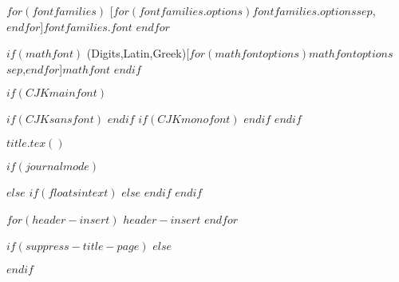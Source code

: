 $for(fontfamilies)$
  [$for(fontfamilies.options)$$fontfamilies.options$$sep$,$endfor$]{$fontfamilies.font$}
$endfor$

$if(mathfont)$
\setmathfont(Digits,Latin,Greek)[$for(mathfontoptions)$$mathfontoptions$$sep$,$endfor$]{$mathfont$}
$endif$

$if(CJKmainfont)$
    \usepackage{xeCJK}
    $if(CJKsansfont)$
    $endif$
    $if(CJKmonofont)$
    $endif$
$endif$

$title.tex()$

$if(journalmode)$
\usepackage{pbalance} 
\usepackage{float}
\makeatletter
\let\oldtpt\ThreePartTable
\let\endoldtpt\endThreePartTable
\def\ThreePartTable{\@ifnextchar[\ThreePartTable@i \ThreePartTable@ii}
\def\ThreePartTable@i[#1]{\begin{figure}[!htbp]
\onecolumn
\begin{minipage}{0.5\textwidth}
\oldtpt[#1]
}
\def\ThreePartTable@ii{\begin{figure}[!htbp]
\onecolumn
\begin{minipage}{0.5\textwidth}
\oldtpt
}
\def\endThreePartTable{
\endoldtpt
\end{minipage}
\twocolumn
\end{figure}}
\makeatother


\makeatletter
\let\endoldlt\endlongtable		
\def\endlongtable{
\hline
\endoldlt}
\makeatother

\newenvironment{twocolumntable}%
{%
\begin{table*}[!htbp]%
\onecolumn%
}%
{%
\twocolumn%
\end{table*}%
}%
$else$
\makeatletter
\let\endoldlt\endlongtable
\def\endlongtable{
\hline
\endoldlt
}
\makeatother
$if(floatsintext)$
$else$
\RequirePackage{longtable}
$endif$
$endif$



$for(header-insert)$
$header-insert$
$endfor$




$if(suppress-title-page)$
$else$
\maketitle
$endif$

